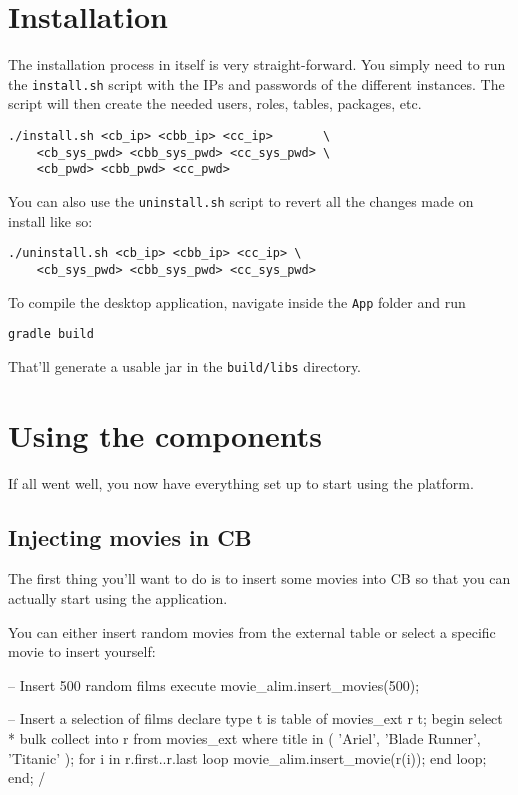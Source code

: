 \documentclass[a4paper]{article}
\begin{document}
\section{Installation}

The installation process in itself is very straight-forward. You simply need to run the \texttt{install.sh} script with the IPs and passwords of the different instances. The script will then create the needed users, roles, tables, packages, etc.

\begin{verbatim}
./install.sh <cb_ip> <cbb_ip> <cc_ip>       \
    <cb_sys_pwd> <cbb_sys_pwd> <cc_sys_pwd> \
    <cb_pwd> <cbb_pwd> <cc_pwd>
\end{verbatim}

You can also use the \texttt{uninstall.sh} script to revert all the changes made on install like so:

\begin{verbatim}
./uninstall.sh <cb_ip> <cbb_ip> <cc_ip> \
    <cb_sys_pwd> <cbb_sys_pwd> <cc_sys_pwd>
\end{verbatim}

To compile the desktop application, navigate inside the \texttt{App} folder and run
\begin{verbatim}
gradle build
\end{verbatim}
That'll generate a usable jar in the \texttt{build/libs} directory.

\section{Using the components}

If all went well, you now have everything set up to start using the platform.

\subsection{Injecting movies in CB}

The first thing you'll want to do is to insert some movies into CB so that you can actually start using the application.\par
You can either insert random movies from the external table or select a specific movie to insert yourself:

\begin{sqlcode}
-- Insert 500 random films
execute movie_alim.insert_movies(500);

-- Insert a selection of films
declare
    type t is table of movies_ext%
    r t;
begin
    select * bulk collect into r from movies_ext where title in (
        'Ariel', 'Blade Runner', 'Titanic'
    );
    for i in r.first..r.last loop
        movie_alim.insert_movie(r(i));
    end loop;
end;
/
\end{sqlcode}
\end{document}

